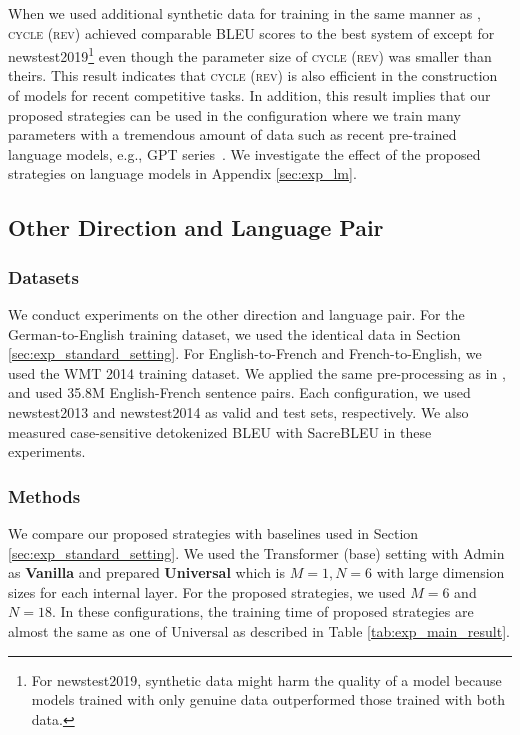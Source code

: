 \documentclass[11pt]{article}
\begin{document}
When we used additional synthetic data for training in the same manner as \cite{kiyono-etal-2020-tohoku}, \textsc{cycle (rev)} achieved comparable BLEU scores to the best system of \cite{kiyono-etal-2020-tohoku} except for newstest2019\footnote{For newstest2019, synthetic data might harm the quality of a model because models trained with only genuine data outperformed those trained with both data.} even though the parameter size of \textsc{cycle (rev)} was smaller than theirs.
This result indicates that \textsc{cycle (rev)} is also efficient in the construction of models for recent competitive tasks.
In addition, this result implies that our proposed strategies can be used in the configuration where we train many parameters with a tremendous amount of data such as recent pre-trained language models, e.g., GPT series~\cite{NEURIPS2020_1457c0d6}.
We investigate the effect of the proposed strategies on language models in Appendix \ref{sec:exp_lm}.

\subsection{Other Direction and Language Pair}
\label{sec:exp_other_configurations}

\subsubsection{Datasets}
We conduct experiments on the other direction and language pair.
For the German-to-English training dataset, we used the identical data in Section \ref{sec:exp_standard_setting}.
For English-to-French and French-to-English, we used the WMT 2014 training dataset.
We applied the same pre-processing as in \cite{ott-etal-2018-scaling}, and used 35.8M English-French sentence pairs.
Each configuration, we used newstest2013 and newstest2014 as valid and test sets, respectively.
We also measured case-sensitive detokenized BLEU with SacreBLEU in these experiments.

\subsubsection{Methods}
We compare our proposed strategies with baselines used in Section \ref{sec:exp_standard_setting}.
We used the Transformer (base) setting with Admin as \textbf{Vanilla} and prepared \textbf{Universal} which is $M=1, N=6$ with large dimension sizes for each internal layer.
For the proposed strategies, we used $M = 6$ and $N = 18$.
In these configurations, the training time of proposed strategies are almost the same as one of Universal as described in Table \ref{tab:exp_main_result}.
\end{document}
